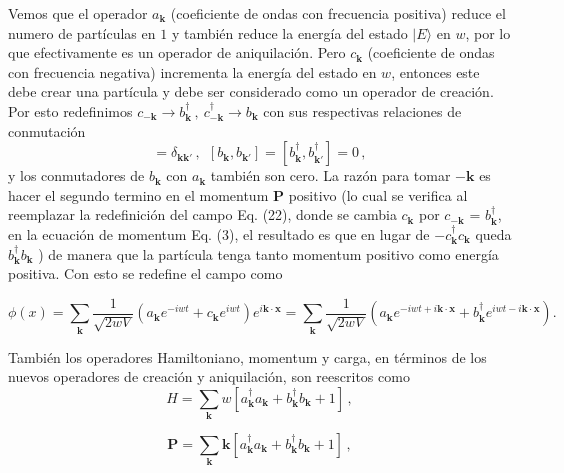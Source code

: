 \documentclass{article}
\begin{document}
Vemos que el operador $a_{\mathbf{k}}$ (coeficiente de ondas con frecuencia positiva) reduce el numero de partículas en $1$ y también reduce la energía del estado $|E\rangle$ en $w$, por lo que efectivamente es un operador de aniquilación. Pero  $c_{\mathbf{k}}$ (coeficiente de ondas con frecuencia negativa) incrementa la energía del estado en $w$, entonces este debe crear una partícula y debe ser considerado como un operador de creación. Por esto redefinimos
$c_{\mathbf{-k}} \rightarrow b_{\mathbf{k}}^\dagger\,, \  c_{\mathbf{-k}}^\dagger \rightarrow b_{\mathbf{k}}$ con sus respectivas relaciones de conmutación 
%
\begin{equation}
  [b_{\mathbf{k}},b_{{\mathbf{k}}'}^\dagger] = \delta_{\mathbf{kk'}}\,, \ \  [b_{\mathbf{k}},b_{{\mathbf{k}}'}] = [b_{\mathbf{k}}^\dagger,b_{{\mathbf{k}}'}^\dagger] = 0\,,
\end{equation}
y los conmutadores de $b_{\mathbf{k}}$ con $a_{\mathbf{k}}$ también son cero. La razón para tomar $\mathbf{-k}$ es hacer el segundo termino en el momentum $\mathbf{P}$ positivo (lo cual se verifica al reemplazar la redefinición del campo Eq. (22), donde se cambia $c_\mathbf{k}$ por $c_\mathbf{-k}$ = $b_\mathbf{k}^\dagger$, en la ecuación de momentum Eq. (3), el resultado es que en lugar de $-c_\mathbf{k}^\dagger c_\mathbf{k}$ queda $b_\mathbf{k}^\dagger b_\mathbf{k}$ ) de manera que la partícula tenga tanto momentum positivo como energía positiva. Con esto se redefine el campo como

\begin{equation}
  \phi(x) = \sum_{\mathbf{k}} \frac{1}{\sqrt{2wV}} (a_{\mathbf{k}}e^{-iwt}+c_{\mathbf{k}}e^{iwt}) e^{i\mathbf{k} \cdot \mathbf{x}} = \sum_{\mathbf{k}} \frac{1}{\sqrt{2wV}} (a_{\mathbf{k}}e^{-iwt+i\mathbf{k} \cdot \mathbf{x}}+b_{\mathbf{k}}^\dagger e^{iwt-i\mathbf{k} \cdot \mathbf{x}}).
\end{equation}

También los operadores Hamiltoniano, momentum y carga, en términos de los nuevos operadores de creación y aniquilación, son reescritos como
%
\begin{equation}
  H = \sum_{\mathbf{k}} w[a_{\mathbf{k}}^\dagger a_{\mathbf{k}} + b_{\mathbf{k}}^\dagger b_{\mathbf{k}} + 1]\,,
\end{equation}

\begin{equation}
  \mathbf{P} = \sum_{{\mathbf{k}}} \mathbf{k}[a_{\mathbf{k}}^\dagger a_{\mathbf{k}} + b_{\mathbf{k}}^\dagger b_{\mathbf{k}} + 1]\,,
\end{equation}
\end{document}
